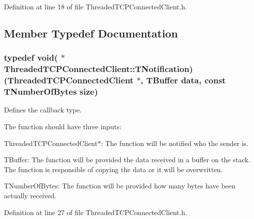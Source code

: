 Definition at line 18 of file Threaded\-T\-C\-P\-Connected\-Client.\-h.



\subsection{Member Typedef Documentation}
\hypertarget{class_threaded_t_c_p_connected_client_a0b2385571a0d98483ddc7ca84bc82cf4}{
\subsubsection[{T\-Notification}]{\setlength{\rightskip}{0pt plus 5cm}typedef void( $\ast$ Threaded\-T\-C\-P\-Connected\-Client\-::\-T\-Notification)({\bf Threaded\-T\-C\-P\-Connected\-Client} $\ast$, {\bf T\-Buffer} data, const {\bf T\-Number\-Of\-Bytes} size)}}\label{class_threaded_t_c_p_connected_client_a0b2385571a0d98483ddc7ca84bc82cf4}


Defines the callback type. 

The function should have three inputs\-:
\begin{DoxyItemize}
\item Threaded\-T\-C\-P\-Connected\-Client$\ast$\-: The function will be notified who the sender is.
\item T\-Buffer\-: The function will be provided the data received in a buffer on the stack. The function is responsible of copying the data or it will be overwritten.
\item T\-Number\-Of\-Bytes\-: The function will be provided how many bytes have been actually received. 
\end{DoxyItemize}

Definition at line 27 of file Threaded\-T\-C\-P\-Connected\-Client.\-h.



